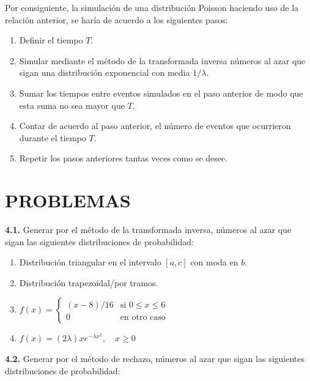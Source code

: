 \documentclass[11pt,letterpaper]{report}
\begin{document}
Por consiguiente, la simulación de una distribución Poisson haciendo uso de la relación anterior, se haría de acuerdo a los siguientes pasos:
\begin{enumerate}
    \item Definir el tiempo $T$.
    \item Simular mediante el método de la transformada inversa números al azar que sigan una distribución exponencial con media $1/\lambda$.
    \item Sumar los tiempos entre eventos simulados en el paso anterior de modo que esta suma no sea mayor que $T$.
    \item Contar de acuerdo al paso anterior, el número de eventos que ocurrieron durante el tiempo $T$.
    \item Repetir los pasos anteriores tantas veces como se desee.
\end{enumerate}

\section*{PROBLEMAS}

\textbf{4.1.} Generar por el método de la transformada inversa, números al azar que sigan las siguientes distribuciones de probabilidad:

\begin{enumerate}
    \item[a)] Distribución triangular en el intervalo $[a, c]$ con moda en $b$.
    \item[b)] Distribución trapezoidal/por tramos.
    \item[c)] $f(x) = \begin{cases} (x - 8)/16 & \text{si } 0 \le x \le 6 \\ 0 & \text{en otro caso} \end{cases}$
    \item[d)] $f(x) = (2\lambda) x e^{-\lambda x^2}, \quad x \ge 0$
\end{enumerate}

\textbf{4.2.} Generar por el método de rechazo, números al azar que sigan las siguientes distribuciones de probabilidad:
\end{document}
